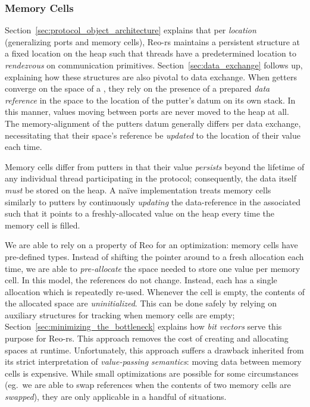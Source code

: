 \subsubsection{Memory Cells}
\label{sec:memory_cells}
Section~\ref{sec:protocol_object_architecture} explains that per \textit{location} (generalizing ports and memory cells), Reo-rs maintains a persistent  structure at a fixed location on the heap such that threads have a predetermined location to \textit{rendezvous} on communication primitives. Section~\ref{sec:data_exchange} follows up, explaining how these structures are also pivotal to data exchange. When getters converge on the space of a , they rely on the presence of a prepared \textit{data reference} in the space to the location of the putter's datum on its own stack. In this manner, values moving between ports are never moved to the heap at all. The memory-alignment of the putters datum generally differs per data exchange, necessitating that their space's reference be \textit{updated} to the location of their value each time. 

Memory cells differ from putters in that their value \textit{persists} beyond the lifetime of any individual thread participating in the protocol; consequently, the data itself \textit{must} be stored on the heap. A na\"ive implementation treats memory cells similarly to putters by continuously \textit{updating} the data-reference in the associated  such that it points to a freshly-allocated value on the heap every time the memory cell is filled.

We are able to rely on a property of Reo for an optimization: memory cells have pre-defined types. Instead of shifting the pointer around to a fresh allocation each time, we are able to \textit{pre-allocate} the space needed to store one value per memory cell. In this model, the references do not change. Instead, each has a single allocation which is repeatedly re-used. Whenever the cell is empty, the contents of the allocated space are \textit{uninitialized}. This can be done safely by relying on auxiliary structures for tracking when memory cells are empty; Section~\ref{sec:minimizing_the_bottleneck} explains how \textit{bit vectors} serve this purpose for Reo-rs. This approach removes the cost of creating and allocating spaces at runtime. Unfortunately, this approach suffers a drawback inherited from its strict interpretation of \textit{value-passing semantics}: moving data between memory cells is expensive. While small optimizations are possible for some circumstances (eg.\ we are able to swap references when the contents of two memory cells are \textit{swapped}), they are only applicable in a handful of situations. 

